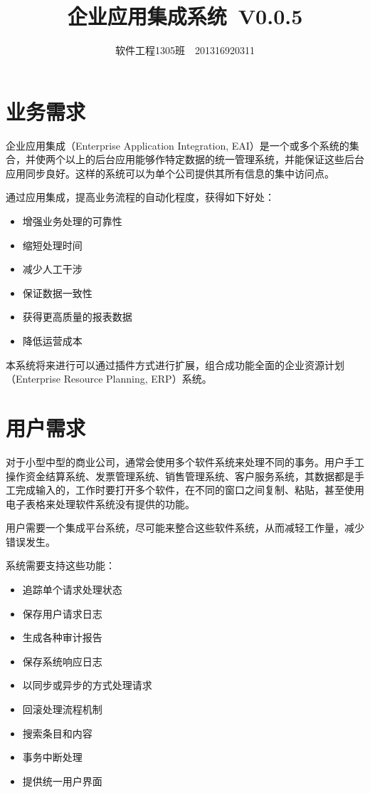 \documentclass[cs4size,a4paper,nofonts]{ctexart}
\def\tjf{{\tt{田劲锋}}}
\def\titlec{企业应用集成系统}
\def\version{V0.0.5}
\begin{document}

\title{\bf\titlec~\version}
\author{软件工程1305班~\quad\tjf\quad~201316920311}
\maketitle

\section{业务需求}

企业应用集成（Enterprise Application Integration, EAI）是一个或多个系统的集合，并使两个以上的后台应用能够作特定数据的统一管理系统，并能保证这些后台应用同步良好。这样的系统可以为单个公司提供其所有信息的集中访问点。

通过应用集成，提高业务流程的自动化程度，获得如下好处：

\begin{itemize}
\item 增强业务处理的可靠性
\item 缩短处理时间
\item 减少人工干涉
\item 保证数据一致性
\item 获得更高质量的报表数据
\item 降低运营成本
\end{itemize}

本系统将来进行可以通过插件方式进行扩展，组合成功能全面的企业资源计划（Enterprise Resource Planning, ERP）系统。

\section{用户需求}

对于小型中型的商业公司，通常会使用多个软件系统来处理不同的事务。用户手工操作资金结算系统、发票管理系统、销售管理系统、客户服务系统，其数据都是手工完成输入的，工作时要打开多个软件，在不同的窗口之间复制、粘贴，甚至使用电子表格来处理软件系统没有提供的功能。

用户需要一个集成平台系统，尽可能来整合这些软件系统，从而减轻工作量，减少错误发生。

系统需要支持这些功能：

\begin{itemize}
\item 追踪单个请求处理状态
\item 保存用户请求日志
\item 生成各种审计报告
\item 保存系统响应日志
\item 以同步或异步的方式处理请求
\item 回滚处理流程机制
\item 搜索条目和内容
\item 事务中断处理
\item 提供统一用户界面
\end{itemize}
\end{document}
